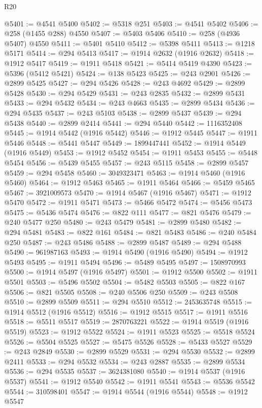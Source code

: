 \begin{lexlean}{R20}
\begin{coremodule}
{@5401 := @4541 @5400
@5402 := @5318 @251
@5403 := @4541 @5402
@5406 := @258 (@1455 @288) @4550
@5407 := @5403 @5406
@5410 := @258 (@4936 @5407) @4550
@5411 := @5401 @5410
@5412 := @5398 @5411
@5413 := @1218 @5171
@5414 := @294 @5413
@5417 := @1914 @2632 (@1916 @2632)
@5418 := @1912 @5417
@5419 := @1911 @5418
@5421 := @5414 @5419 @4390
@5423 := @5396 (@5412 @5421)
@5424 := @138 @5423
@5425 := @243 @2901
@5426 := @2899 @5425
@5427 := @294 @5426
@5428 := @243 @4692
@5429 := @2899 @5428
@5430 := @294 @5429
@5431 := @243 @2835
@5432 := @2899 @5431
@5433 := @294 @5432
@5434 := @243 @4663
@5435 := @2899 @5434
@5436 := @294 @5435
@5437 := @243 @5103
@5438 := @2899 @5437
@5439 := @294 @5438
@5440 := @2899 @2414
@5441 := @294 @5440
@5442 := 1116352408
@5445 := @1914 @5442 (@1916 @5442)
@5446 := @1912 @5445
@5447 := @1911 @5446
@5448 := @5441 @5447
@5449 := 1899447441
@5452 := @1914 @5449 (@1916 @5449)
@5453 := @1912 @5452
@5454 := @1911 @5453
@5455 := @5448 @5454
@5456 := @5439 @5455
@5457 := @243 @5115
@5458 := @2899 @5457
@5459 := @294 @5458
@5460 := 3049323471
@5463 := @1914 @5460 (@1916 @5460)
@5464 := @1912 @5463
@5465 := @1911 @5464
@5466 := @5459 @5465
@5467 := 3921009573
@5470 := @1914 @5467 (@1916 @5467)
@5471 := @1912 @5470
@5472 := @1911 @5471
@5473 := @5466 @5472
@5474 := @5456 @5473
@5475 := @5436 @5474
@5476 := @822 @111
@5477 := @821 @5476
@5479 := @240 @5477 @250
@5480 := @243 @5479
@5481 := @2899 @5480
@5482 := @294 @5481
@5483 := @822 @161
@5484 := @821 @5483
@5486 := @240 @5484 @250
@5487 := @243 @5486
@5488 := @2899 @5487
@5489 := @294 @5488
@5490 := 961987163
@5493 := @1914 @5490 (@1916 @5490)
@5494 := @1912 @5493
@5495 := @1911 @5494
@5496 := @5489 @5495
@5497 := 1508970993
@5500 := @1914 @5497 (@1916 @5497)
@5501 := @1912 @5500
@5502 := @1911 @5501
@5503 := @5496 @5502
@5504 := @5482 @5503
@5505 := @822 @167
@5506 := @821 @5505
@5508 := @240 @5506 @250
@5509 := @243 @5508
@5510 := @2899 @5509
@5511 := @294 @5510
@5512 := 2453635748
@5515 := @1914 @5512 (@1916 @5512)
@5516 := @1912 @5515
@5517 := @1911 @5516
@5518 := @5511 @5517
@5519 := 2870763221
@5522 := @1914 @5519 (@1916 @5519)
@5523 := @1912 @5522
@5524 := @1911 @5523
@5525 := @5518 @5524
@5526 := @5504 @5525
@5527 := @5475 @5526
@5528 := @5433 @5527
@5529 := @243 @2849
@5530 := @2899 @5529
@5531 := @294 @5530
@5532 := @2899 @2411
@5533 := @294 @5532
@5534 := @243 @2887
@5535 := @2899 @5534
@5536 := @294 @5535
@5537 := 3624381080
@5540 := @1914 @5537 (@1916 @5537)
@5541 := @1912 @5540
@5542 := @1911 @5541
@5543 := @5536 @5542
@5544 := 310598401
@5547 := @1914 @5544 (@1916 @5544)
@5548 := @1912 @5547
}
\end{coremodule}
\end{lexlean}

